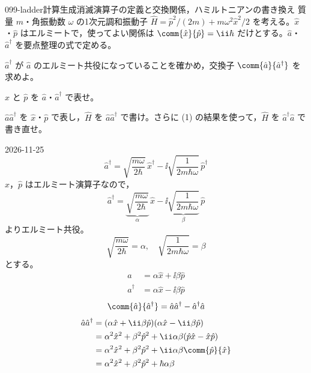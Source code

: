 \documentclass[uplatex,dvipdfmx,a4paper,11pt]{jsarticle}
\begin{document}
\begin{mondai}{099-ladder}{計算}{生成消滅演算子の定義と交換関係，ハミルトニアンの書き換え}
  質量 $m$・角振動数 $\omega$ の1次元調和振動子 $\hat{H}=\hat{p}^{2}/(2m)+m\omega^{2}\hat{x}^{2}/2$ を考える。$\hat{x}$・$\hat{p}$ はエルミートで，使ってよい関係は $\comm{\hat{x}}{\hat{p}}=\ii\hbar$ だけとする。$\hat{a}$・$\hat{a}^{\dagger}$ を要点整理の式で定める。
  \begin{shoumon}
    \item $\hat{a}^{\dagger}$ が $\hat{a}$ のエルミート共役になっていることを確かめ，交換子 $\comm{\hat{a}}{\hat{a}^{\dagger}}$ を求めよ。
    \item $\hat{x}$ と $\hat{p}$ を $\hat{a}$・$\hat{a}^{\dagger}$ で表せ。
    \item $\hat{a}\hat{a}^{\dagger}$ を $\hat{x}$・$\hat{p}$ で表し，$\hat{H}$ を $\hat{a}\hat{a}^{\dagger}$ で書け。さらに (1) の結果を使って，$\hat{H}$ を $\hat{a}^{\dagger}\hat{a}$ で書き直せ。
  \end{shoumon}
\begin{kotaeutsushi}{2026-11-25}
\[ \hat{a}^{\dagger}=\sqrt{\frac{m\omega}{2\hbar}}\,\hat{x}^{\dagger}-\ii\sqrt{\frac{1}{2m\hbar\omega}}\,\hat{p}^{\dagger} \]
$\hat{x}$，$\hat{p}$ はエルミート演算子なので，
\[ \hat{a}^{\dagger}=\underbrace{\sqrt{\frac{m\omega}{2\hbar}}}_{\alpha}\,\hat{x}-\ii\underbrace{\sqrt{\frac{1}{2m\hbar\omega}}}_{\beta}\,\hat{p} \]
よりエルミート共役。
\[ \sqrt{\frac{m\omega}{2\hbar}}=\alpha,\quad\sqrt{\frac{1}{2m\hbar\omega}}=\beta \]
とする。
\begin{align*}
\hat{a}&=\alpha\hat{x}+\ii\beta\hat{p}\\
\hat{a}^{\dagger}&=\alpha\hat{x}-\ii\beta\hat{p}
\end{align*}
\[ \comm{\hat{a}}{\hat{a}^{\dagger}}=\hat{a}\hat{a}^{\dagger}-\hat{a}^{\dagger}\hat{a} \]
\begin{align*}
\hat{a}\hat{a}^{\dagger}&=(\alpha\hat{x}+\ii\beta\hat{p})(\alpha\hat{x}-\ii\beta\hat{p})\\
&=\alpha^{2}\hat{x}^{2}+\beta^{2}\hat{p}^{2}+\ii\alpha\beta(\hat{p}\hat{x}-\hat{x}\hat{p})\\
&=\alpha^{2}\hat{x}^{2}+\beta^{2}\hat{p}^{2}+\ii\alpha\beta\comm{\hat{p}}{\hat{x}}\\
&=\alpha^{2}\hat{x}^{2}+\beta^{2}\hat{p}^{2}+\hbar\alpha\beta
\end{align*}
\begin{align*}

\end{align*}
\end{kotaeutsushi}
\end{mondai}
\end{document}
